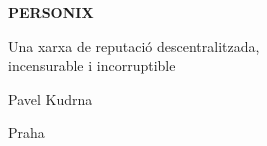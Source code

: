 \thispagestyle{empty}
\begin{center}
  {\sffamily\bfseries\fontsize{34}{40}\selectfont PERSONIX\par}
  \vspace{2.2em}
  {\rmfamily\large Una xarxa de reputació descentralitzada,\\[0.25em]
   incensurable i incorruptible\par}
\end{center}
\begin{center}
  {\rmfamily\Large Pavel Kudrna\par}
  \vspace{0.45em}
  {\rmfamily\small Praha\quad\textbullet{}\par}
\end{center}
\clearpage
